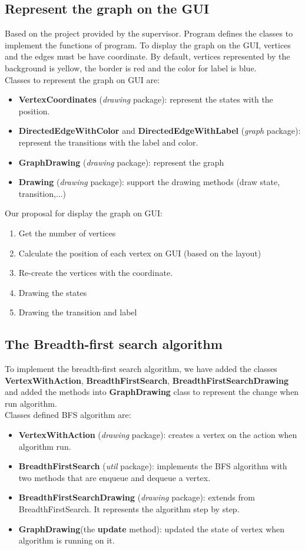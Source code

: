 \subsection{Represent the graph on the GUI}
Based on the project provided by the supervisor. Program defines the classes to implement the functions of program.
To display the graph on the GUI, vertices and the edges must be have coordinate. By default, vertices represented by the background is yellow, the border is red and the color for label is blue.
\\[0.5cm]
Classes to represent the graph on GUI are:
\begin{itemize}
\item \textbf{VertexCoordinates} (\textit{drawing} package): represent the states with the position.
\item \textbf{DirectedEdgeWithColor} and \textbf{DirectedEdgeWithLabel} (\textit{graph} package): represent the transitions with the label and color.
\item \textbf{GraphDrawing} (\textit{drawing} package): represent the graph
\item \textbf{Drawing} (\textit{drawing} package): support the drawing methods (draw state, transition,...)
\end{itemize}
Our proposal for display the graph on GUI:
\begin{enumerate}
\item Get the number of vertices
\item Calculate the position of each vertex on GUI (based on the layout)
\item Re-create the vertices with the coordinate.
\item Drawing the states
\item Drawing the transition and label
\end{enumerate}
\subsection{The Breadth-first search algorithm}
To implement the breadth-first search algorithm, we have added the classes \textbf{VertexWithAction}, \textbf{BreadthFirstSearch}, \textbf{BreadthFirstSearchDrawing} and added the methods into \textbf{GraphDrawing} class to represent the change when run algorithm.
\\[0.5cm]
Classes defined BFS algorithm are:
\begin{itemize}
\item \textbf{VertexWithAction} (\textit{drawing} package): creates a vertex on the action when algorithm run.
\item \textbf{BreadthFirstSearch} (\textit{util} package): implements the BFS algorithm with two methods that are enqueue and dequeue a vertex.
\item \textbf{BreadthFirstSearchDrawing} (\textit{drawing} package): extends from BreadthFirstSearch. It represents the algorithm step by step.
\item \textbf{GraphDrawing}(the \textbf{update} method): updated the state of vertex when algorithm is running on it.
\end{itemize}

